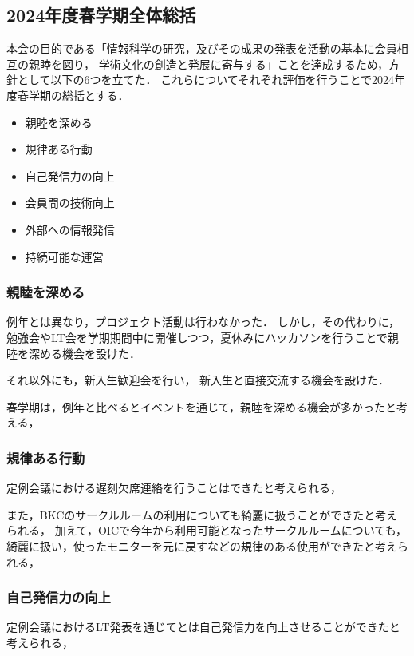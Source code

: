 \subsection*{2024年度春学期全体総括}


本会の目的である「情報科学の研究，及びその成果の発表を活動の基本に会員相互の親睦を図り，
学術文化の創造と発展に寄与する」ことを達成するため，方針として以下の6つを立てた．
これらについてそれぞれ評価を行うことで2024年度春学期の総括とする．

\begin{itemize}
    \item 親睦を深める
    \item 規律ある行動
    \item 自己発信力の向上
    \item 会員間の技術向上
    \item 外部への情報発信
    \item 持続可能な運営
  \end{itemize}


\subsubsection*{親睦を深める}
例年とは異なり，プロジェクト活動は行わなかった．
しかし，その代わりに，勉強会やLT会を学期期間中に開催しつつ，夏休みにハッカソンを行うことで親睦を深める機会を設けた．

それ以外にも，新入生歓迎会を行い， 新入生と直接交流する機会を設けた．

春学期は，例年と比べるとイベントを通じて，親睦を深める機会が多かったと考える，

\subsubsection*{規律ある行動}
定例会議における遅刻欠席連絡を行うことはできたと考えられる，

また，BKCのサークルルームの利用についても綺麗に扱うことができたと考えられる，
加えて，OICで今年から利用可能となったサークルルームについても，綺麗に扱い，使ったモニターを元に戻すなどの規律のある使用ができたと考えられる，

\subsubsection*{自己発信力の向上}
定例会議におけるLT発表を通じて\secondGrade{}と\thirdGrade{}は自己発信力を向上させることができたと考えられる，

